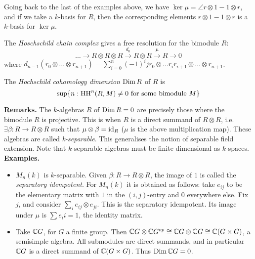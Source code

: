 \documentclass[10pt,a4paper]{article}
\begin{document}
Going back to the last of the examples above, we have $\ker \mu = \angle{r \otimes 1 - 1 \otimes r}$, and if we take a $k$-basis for $R$, then the corresponding elements $r \otimes 1 - 1 \otimes r$ is a $k$-basis for $\ker \mu$.
\begin{definition}
  The \emph{Hoschschild chain complex} gives a free resolution for the bimodule $R$:
  \[\ldots \to R \otimes R \otimes R \xrightarrow{d_0} R \otimes R \xrightarrow{\mu} R \to 0\]
  where $d_{n-1}(r_0 \otimes \ldots \otimes r_{n+1}) = \sum_{i=0}^n (-1)^ij r_0 \otimes \ldots r_i r_{i+1}\otimes \ldots \otimes r_{n+1}$.
\end{definition}
\begin{definition}
  The \emph{Hochschild cohomology dimension} $\operatorname{Dim} R$ of $R$ is
  \[\sup\{n : \operatorname{HH}^n(R, M) \neq 0 \text{ for some bimodule }M\}\]
\end{definition}
\textbf{Remarks.} The $k$-algebras $R$ of $\operatorname{Dim} R = 0$ are precisely those where the bimodule $R$ is projective. This is when $R$ is a direct summand of $R \otimes R$, i.e. $\exists \beta : R \to R \otimes R$ such that $\mu \otimes \beta = \operatorname{id}_R$ ($\mu$ is the above multiplication map). These algebras are called \emph{k-separable}. This generalises the notion of separable field extension. Note that $k$-separable algebras must be finite dimensional as $k$-spaces.
\textbf{Examples.}
\begin{itemize}
  \item $M_n(k)$ is $k$-separable. Given $\beta: R \to R \otimes R$, the image of $1$ is called the \emph{separatory idempotent}. For $M_n(k)$ it is obtained as follows: take $e_{ij}$ to be the elementary matrix with $1$ in the $(i,j)$-entry and $0$ everywhere else. Fix $j$, and consider $\sum_i e_{ij}\otimes e_{ji}$. This is the separatory idempotent. Its image under $\mu$ is $\sum e_ii = 1$, the identity matrix.
  \item Take $\mathbb{C} G$, for $G$ a finite group. Then $\mathbb{C} G \otimes \mathbb{C} G^{op} \cong \mathbb{C} G \otimes \mathbb{C} G \cong \mathbb{C} (G \times G)$, a semisimple algebra. All submodules are direct summands, and in particular $\mathbb{C} G$ is a direct summand of $\mathbb{C}(G \times G)$. Thus $\operatorname{Dim} \mathbb{C} G = 0$.
\end{itemize}
\end{document}
